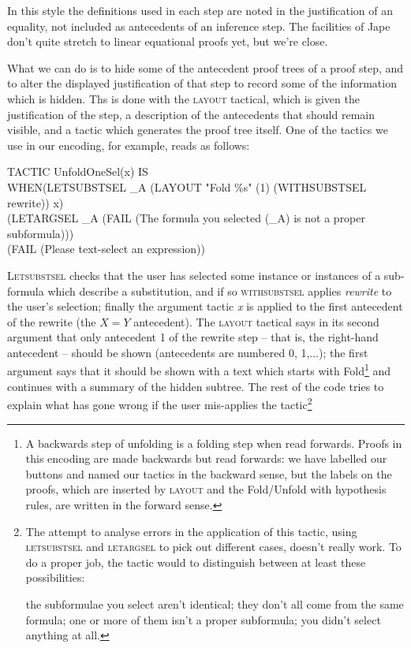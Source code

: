 \documentclass[11pt]{book}
\newcommand{\tab}{\hspace{5mm}}
\begin{document}
In this style the definitions used in each step are noted in the justification of an equality, not included as antecedents of an inference step. The facilities of Jape don't quite stretch to linear equational proofs yet, but we're close.


What we can do is to hide some of the antecedent proof trees of a proof step, and to alter the displayed justification of that step to record some of the information which is hidden. Ths is done with the \textsc{layout} tactical, which is given the justification of the step, a description of the antecedents that should remain visible, and a tactic which generates the proof tree itself. One of the tactics we use in our encoding, for example, reads as follows:

TACTIC UnfoldOneSel(x) IS\\
\tab WHEN\tab (LETSUBSTSEL \_A (LAYOUT "Fold \%s" (1) (WITHSUBSTSEL rewrite)) x)\\
\tab \tab (LETARGSEL \_A (FAIL (The formula you selected (\_A) is not a proper subformula)))\\
\tab \tab (FAIL (Please text-select an expression))


\textsc{Letsubstsel} checks that the user has selected some instance or instances of a sub-formula which describe a substitution, and if so \textsc{withsubstsel} applies \textit{rewrite} to the user's selection; finally the argument tactic \textit{x} is applied to the first antecedent of the rewrite (the $X=Y$ antecedent). The \textsc{layout} tactical says in its second argument that only antecedent 1 of the rewrite step -- that is, the right-hand antecedent -- should be shown (antecedents are numbered 0, 1,...); the first argument says that it should be shown with a text which starts with Fold\footnote{A backwards step of unfolding is a folding step when read forwards. Proofs in this encoding are made backwards but read forwards: we have labelled our buttons and named our tactics in the backward sense, but the labels on the proofs, which are inserted by \textsc{layout} and the Fold/Unfold with hypothesis rules, are written in the forward sense.} and continues with a summary of the hidden subtree. The rest of the code tries to explain what has gone wrong if the user mis-applies the tactic\footnote{The attempt to analyse errors in the application of this tactic, using \textsc{letsubstsel} and \textsc{letargsel} to pick out different cases, doesn't really work. To do a proper job, the tactic would to distinguish between at least these possibilities:

{\textbullet}\tab the subformulae you select aren't identical; {\textbullet}\tab they don't all come from the same formula; {\textbullet}\tab one or more of them isn't a proper subformula; {\textbullet}\tab you didn't select anything at all.}
\end{document}
